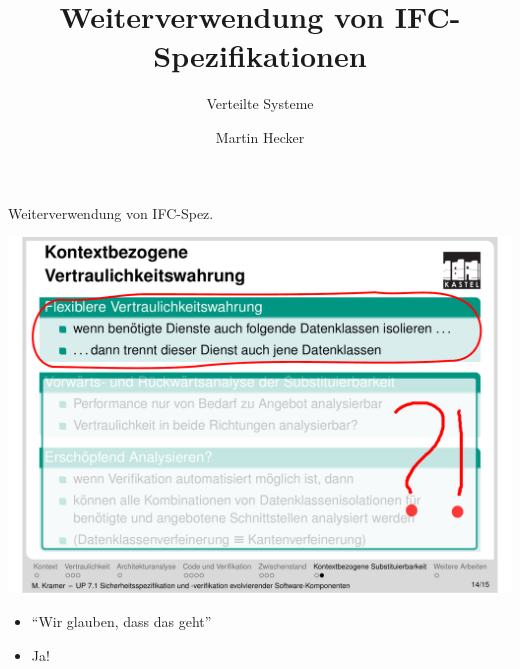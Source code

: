 \documentclass[18pt]{beamer}
\title{Weiterverwendung von IFC-Spezifikationen}
\subtitle{Verteilte Systeme}
\author{Martin Hecker}
\institute{Kompetenzzentrum für angewandte Sicherheitstechnologie}
\begin{document}


\AtBeginSection{\frame{\sectionpage}}

\begin{frame}
\titlepage
\end{frame}

\begin{frame}{Weiterverwendung von IFC-Spez.}
\begin{center}
\begin{minipage}{8cm}
  \includegraphics[width=\columnwidth]{img/IoE_UP_7_1_Evolution_36.pdf}
  \begin{itemize}
    \item \enquote{Wir glauben, dass das geht}
    \item Ja!
  \end{itemize}
\end{minipage}
\end{center}
\end{frame}


\end{document}

